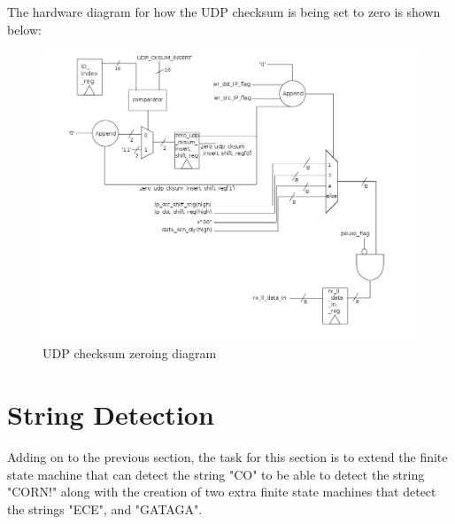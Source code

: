 \documentclass{article}
\begin{document}
The hardware diagram for how the UDP checksum is being set to zero is shown below:
	\begin{figure}[h]
		\begin{center}
			\includegraphics[scale=0.25]{../part2_files/udp_cksum.png}
			\caption{UDP checksum zeroing diagram}
		\end{center}
	\end{figure}


\section{String Detection}
Adding on to the previous section, the task for this section is to extend the finite state machine that can detect the string "CO" to be able to detect the string "CORN!" along with the creation of two extra finite state machines that detect the strings "ECE", and "GATAGA".\\
\end{document}
